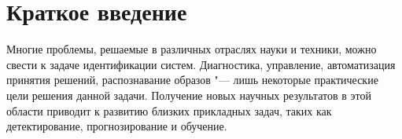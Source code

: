 \section{Краткое введение}

Многие проблемы, решаемые в различных отраслях науки и техники,
можно свести к задаче идентификации систем.
Диагностика, управление, автоматизация принятия решений, распознавание образов
"--- лишь некоторые практические цели решения данной задачи.
Получение новых научных результатов в этой области приводит к
развитию близких прикладных задач,
таких как детектирование, прогнозирование и обучение.



